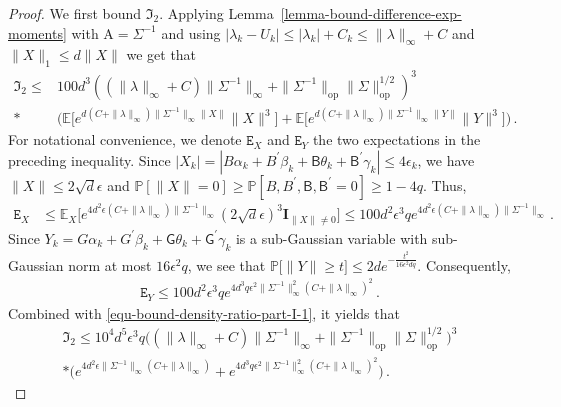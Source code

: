 \documentclass[11pt]{article}
\numberwithin{equation}{section}
\begin{document}
\begin{proof}
We first bound $\mathfrak I_2$. Applying Lemma~\ref{lemma-bound-difference-exp-moments} with $\mathrm{A}=\Sigma^{-1}$ and using $|\lambda_{k}-U_{k}| \leq |\lambda_k|+C_k \leq \| \lambda \|_{\infty} + C$ and $\| X \|_1 \leq d \| X \|$ we get that   
\begin{align*}
\mathfrak I_2 \leq & 100 d^3 ( (\| \lambda \|_{\infty}+C) \| \Sigma^{-1} \|_{\infty} + \| \Sigma^{-1}\|_{\mathrm{op}} \| \Sigma \|_{ \mathrm{op}}^{1/2} )^3  \\
    * & \Big( \mathbb{E} \Big[ e^{ d (C+\|\lambda \|_{\infty}) \| \Sigma^{-1} \|_{\infty} \| X \| } \|X\|^3 \Big]+ \mathbb{E} \Big[ e^{ d (C+\|\lambda \|_{\infty}) \| \Sigma^{-1} \|_{\infty} \| Y \| } \|Y\|^3 \Big] \Big)\,.
\end{align*}
For notational convenience, we denote $\mathtt E_X$ and $\mathtt E_Y$ the two expectations in the preceding inequality. Since $|X_k|=| B \alpha_k + B^{\prime} \beta_k + \mathsf{B} \theta_k + \mathsf{B}^{\prime} \gamma_k | \leq 4 \epsilon_k$, we have $\|X\| \leq 2 \sqrt{d} \epsilon$ and $\mathbb{P}[ \| X \| = 0 ] \geq \mathbb{P}[ B,B^{\prime},\mathsf{B},\mathsf{B}^{\prime} =0] \geq 1-4q$. Thus,
\begin{align}
    \mathtt E_X &\leq  \mathbb{E}_{X} \Big[ e^{ 4 d^2 \epsilon (C+\| \lambda \|_{\infty}) \| \Sigma^{-1} \|_{\infty} } (2\sqrt{d} \epsilon)^3 \mathbf{I}_{\| X \| \neq 0} \Big] \leq 100 d^2 \epsilon^3 q e^{ 4d^2 \epsilon (C+\| \lambda \|_{\infty}) \| \Sigma^{-1} \|_{\infty} }   \,.
    \label{equ-bound-density-ratio-part-I-1}
\end{align}
Since $Y_k= G \alpha_k + G^{\prime} \beta_k + \mathsf{G} \theta_k + \mathsf{G}^{\prime} \gamma_k$ is a sub-Gaussian variable with sub-Gaussian norm at most  $16 \epsilon^2 q$, we see that $\mathbb{P} \big[ \| Y \| \geq t \Big] \leq 2d e^{-\frac{t^2}{16 \epsilon^2 d q}}$. Consequently,
\begin{align*}
    \mathtt E_Y \leq 100 d^2 \epsilon^3 q  e^{4 d^3 q \epsilon^2 \| \Sigma^{-1} \|_{\infty}^2 (C + \| \lambda \|_{\infty})^2   }  \,.
\end{align*}
Combined with \eqref{equ-bound-density-ratio-part-I-1}, it yields that
\begin{align}
    \mathfrak I_2 \leq 10^4 d^{5} \epsilon^3 q \big( (\| \lambda \|_{\infty}+C) \| \Sigma^{-1} \|_{\infty} + \| \Sigma^{-1}\|_{\mathrm{op}} \| \Sigma \|_{ \mathrm{op}}^{1/2} \big)^3 \nonumber \\
    * \Big( e^{ 4d^2 \epsilon \| \Sigma^{-1} \|_{\infty} (C+\| \lambda \|_{\infty} ) } + e^{  4d^3 q \epsilon^2 \| \Sigma^{-1} \|^2_{\infty} (C+\| \lambda \|_{\infty})^2 } \Big) \,.

\end{align}
\end{proof}
\end{document}
